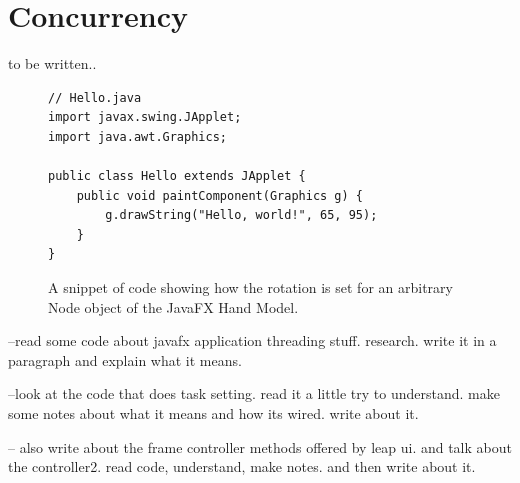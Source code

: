 
\section{Concurrency}
to be written..

\begin{figure}[th]
\centering
\begin{lstlisting}
// Hello.java
import javax.swing.JApplet;
import java.awt.Graphics;

public class Hello extends JApplet {
    public void paintComponent(Graphics g) {
        g.drawString("Hello, world!", 65, 95);
    }    
}
\end{lstlisting}
\caption[setRotationByVector]{A snippet of code showing how the rotation is set for an arbitrary Node object of the JavaFX Hand Model.}
\label{fig:codeSample1}
\end{figure}


--read some code about javafx application threading stuff. research. 
write it in a paragraph and explain what it means. 

--look at the code that does task setting. read it a little try to understand. make some notes about what it means and how its wired. 
write about it. 

-- also write about the frame controller methods offered by leap ui. and talk about the controller2. read code, understand, make notes. and then write about it. 



